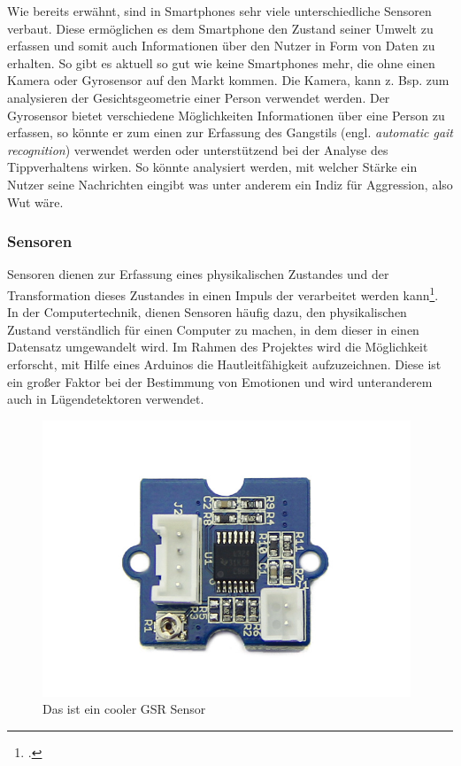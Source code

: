 Wie bereits erwähnt, sind in Smartphones sehr viele unterschiedliche Sensoren verbaut. Diese ermöglichen es dem Smartphone den Zustand seiner Umwelt zu erfassen und somit auch Informationen über den Nutzer in Form von Daten zu erhalten. \newline
So gibt es aktuell so gut wie keine Smartphones mehr, die ohne einen Kamera oder Gyrosensor auf den Markt kommen. Die Kamera, kann z. Bsp. zum analysieren der Gesichtsgeometrie einer Person verwendet werden. Der Gyrosensor bietet verschiedene Möglichkeiten Informationen über eine Person zu erfassen, so könnte er zum einen zur Erfassung des Gangstils (engl. \textit{automatic gait recognition}) verwendet werden oder unterstützend bei der Analyse des Tippverhaltens wirken. So könnte analysiert werden, mit welcher Stärke ein Nutzer seine Nachrichten eingibt was unter anderem ein Indiz für Aggression, also Wut wäre. 
\subsubsection{Sensoren}
Sensoren dienen zur Erfassung eines physikalischen Zustandes und der Transformation dieses Zustandes in einen Impuls der verarbeitet werden kann\footcite[Vgl.][]{Web18}. In der Computertechnik, dienen Sensoren häufig dazu, den physikalischen Zustand verständlich für einen Computer zu machen, in dem dieser in einen Datensatz umgewandelt wird.  
Im Rahmen des Projektes wird die Möglichkeit erforscht, mit Hilfe eines Arduinos die Hautleitfähigkeit aufzuzeichnen. 
Diese ist ein großer Faktor bei der Bestimmung von Emotionen und wird unteranderem auch in Lügendetektoren verwendet. 
\begin{figure}[h]
	\centering
	\includegraphics[width=11cm]{Bilder/sensor.jpg}
	\caption{Das ist ein cooler GSR Sensor}
\end{figure}%
